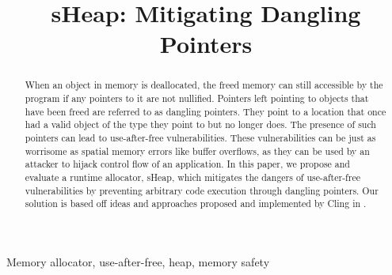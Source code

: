 \documentclass[conference]{IEEEtran}
\begin{document}
\title{sHeap: Mitigating Dangling Pointers\\}

\author{
\and
{}
\and
{}
}

\maketitle

\begin{abstract}
When an object in memory is deallocated, the freed memory can still accessible 
by the program if any pointers to it are not nullified. Pointers left pointing 
to objects that have been freed are referred to as dangling pointers. They 
point to a location that once had a valid object of the type they point to but 
no longer does. The presence of such pointers can lead to use-after-free 
vulnerabilities. These vulnerabilities can be just as worrisome as spatial 
memory errors like buffer overflows, as they can be used by an attacker to 
hijack control flow of an application. In this paper, we propose and evaluate 
a runtime allocator, sHeap, which mitigates the dangers of use-after-free 
vulnerabilities by preventing arbitrary code execution through dangling 
pointers. Our solution is based off ideas and approaches proposed and 
implemented by Cling in \cite{b1}.
\end{abstract}

\begin{IEEEkeywords}
Memory allocator, use-after-free, heap, memory safety
\end{IEEEkeywords}
\end{document}
